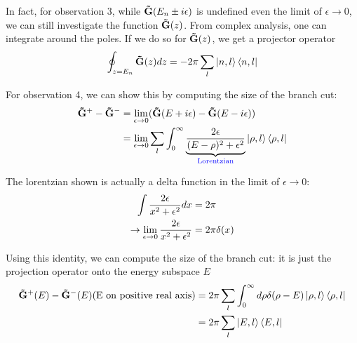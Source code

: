 \documentclass[11pt]{article}
\theoremstyle{definition}
\begin{document}
In fact, for observation 3, while $\mathbf{\tilde{G}}(E_n \pm i \epsilon)$ is undefined even the limit of $\epsilon \rightarrow 0$, we can still investigate the function $\mathbf{\tilde{G}}(z)$.  From complex analysis, one can integrate around the poles.  If we do so for $\mathbf{\tilde{G}}(z)$, we get a projector operator
$$\oint_{z = E_n} \mathbf{\tilde{G}}(z) {dz} =  -2 \pi \sum_{l} \ket{n, l} \bra{n, l}$$

For observation 4, we can show this by computing the size of the branch cut:
\begin{align}
\mathbf{\tilde{G}}^+ - \mathbf{\tilde{G}}^- &= \lim_{\epsilon \rightarrow 0} (\mathbf{\tilde{G}}(E + i \epsilon) - \mathbf{\tilde{G}}(E- i \epsilon)) \\
& = \lim_{\epsilon \rightarrow 0}\sum_l \int_0^\infty \underbrace{2 \epsilon \over (E - \rho)^2 + \epsilon^2}_{\text{\color{blue} Lorentzian}} \ket{\rho, l} \bra{\rho, l}
\end{align}

The lorentzian shown is actually a delta function in the limit of $\epsilon \rightarrow 0$:
\begin{align}
 \int {2 \epsilon \over x^2 + \epsilon^2} dx & = 2 \pi \\
\rightarrow  \lim_{\epsilon \rightarrow 0}  {2 \epsilon \over x^2 + \epsilon^2} &= 2 \pi \delta(x)
\end{align}

Using this identity, we can compute the size of the branch cut: it is just the projection operator onto the energy subspace $E$
\begin{align}
\mathbf{\tilde{G}}^+(E) - \mathbf{\tilde{G}}^-(E) \text{(E on positive real axis)} &= 2\pi \sum_l \int_0^\infty d\rho  \delta(\rho - E) \ket{\rho, l} \bra{\rho, l} \\
 &=2 \pi \sum_l \ket{E, l} \bra{E, l} 
\end{align}
\end{document}
